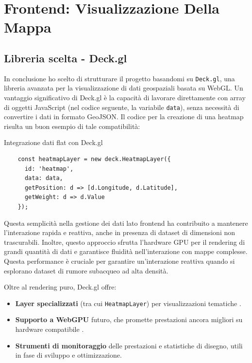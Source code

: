 \section{Frontend: Visualizzazione Della Mappa}
\label{ch:frontend-advanced}

\subsection{Libreria scelta - Deck.gl}

In conclusione ho scelto di strutturare il progetto basandomi su \texttt{Deck.gl}, una libreria avanzata per la visualizzazione di dati geospaziali basata su WebGL. Un vantaggio significativo di Deck.gl è la capacità di lavorare direttamente con array di oggetti JavaScript (nel codice seguente, la variabile \texttt{data}), senza necessità di convertire i dati in formato GeoJSON. \cite{deckgl-heatmap} Il codice per la creazione di una heatmap risulta un buon esempio di tale compatibilità:

\begin{listing}[H]
\caption{Integrazione dati flat con Deck.gl}
\label{lst:deckgl_heatmap_layer} %
\begin{verbatim}
    const heatmapLayer = new deck.HeatmapLayer({
      id: 'heatmap',
      data: data,
      getPosition: d => [d.Longitude, d.Latitude],
      getWeight: d => d.Value
    });
\end{verbatim}
\end{listing}

Questa semplicità nella gestione dei dati lato frontend ha contribuito a mantenere l'interazione rapida e reattiva, anche in presenza di dataset di dimensioni non trascurabili. Inoltre, questo approccio sfrutta l'hardware GPU per il rendering di grandi quantità di dati e garantisce fluidità nell'interazione con mappe complesse. Questa performance è cruciale per garantire un'interazione reattiva quando si esplorano dataset di rumore subacqueo ad alta densità. \cite{deckgl-heatmap}

Oltre al rendering puro, Deck.gl offre:
\begin{itemize}
  \item \textbf{Layer specializzati} (tra cui \texttt{HeatmapLayer}) per visualizzazioni tematiche \cite{deckgl-docs}.
  \item \textbf{Supporto a WebGPU} futuro, che promette prestazioni ancora migliori su hardware compatibile \cite{deckgl-roadmap}.
  \item \textbf{Strumenti di monitoraggio} delle prestazioni e statistiche di disegno, utili in fase di sviluppo e ottimizzazione.
\end{itemize}

